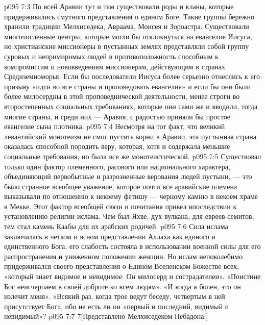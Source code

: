 \vs p095 7:3 По всей Аравии тут и там существовали роды и кланы, которые придерживались смутного представления о едином Боге. Такие группы бережно хранили традиции Мелхиседека, Авраама, Моисея и Зороастра. Существовали многочисленные центры, которые могли бы откликнуться на евангелие Иисуса, но христианские миссионеры в пустынных землях представляли собой группу суровых и непримиримых людей в противоположность способным к компромиссам и нововведениям миссионерам, действующим в странах Средиземноморья. Если бы последователи Иисуса более серьезно отнеслись к его призыву «идти во все страны и проповедовать евангелие» и если бы они были более милосердны в этой проповеднической деятельности, менее строги во второстепенных социальных требованиях, которые они сами же и вводили, тогда многие страны, и среди них --- Аравия, с радостью приняли бы простое евангелие сына плотника.
\vs p095 7:4 Несмотря на тот факт, что великий левантийский монотеизм не смог пустить корни в Аравии, эта пустынная страна оказалась способной породить веру, которая, хотя и содержала меньшие социальные требования, но была все же монотеистической.
\vs p095 7:5 Существовал только один фактор племенного, расового или национального характера, объединяющий первобытные и разрозненные верования людей пустыни, --- это было странное всеобщее уважение, которое почти все аравийские племена выказывали по отношению к некоему фетишу --- черному камню в некоем храме в Мекке. Этот фактор всеобщей связи и почитания привел впоследствии к установлению религии ислама. Чем был Яхве, дух вулкана, для евреев\hyp{}семитов, тем стал камень Каабы для их арабских родичей.
\vs p095 7:6 Сила ислама заключалась в четком и ясном представлении Аллаха как единого и единственного Бога; его слабость состояла в использовании военной силы для его распространения и униженном положении женщин. Но ислам непоколебимо придерживался своего представления о Едином Вселенском Божестве всех, «который знает видимое и невидимое. Он милосерд и сострадателен». «Поистине Бог неисчерпаем в своей доброте ко всем людям». «И когда я болен, это он излечит меня». «Всякий раз, когда трое ведут беседу, четвертым в ней присутствует Бог», ибо не есть ли он «первый и последний, видимый и невидимый»?
\vsetoff
\vs p095 7:7 7[Представлено Мелхиседеком Небадона.]
